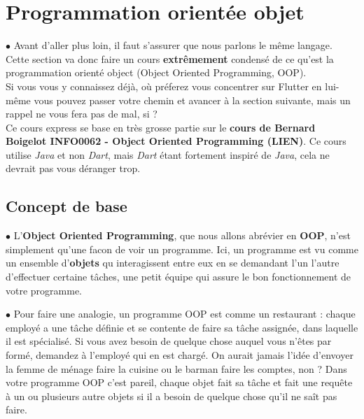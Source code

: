 \section{Programmation orientée objet}
\par $\bullet$ Avant d'aller plus loin, il faut s'assurer que nous parlons le même langage. Cette section va donc faire un cours \textbf{extrêmement} condensé de ce qu'est la programmation orienté object (Object Oriented Programming, OOP). \\

Si vous vous y connaissez déjà, où préferez vous concentrer sur Flutter en lui-même vous pouvez passer votre chemin et avancer à la section suivante, mais un rappel ne vous fera pas de mal, si ? \\

Ce cours express se base en très grosse partie sur le \textbf{cours de Bernard Boigelot INFO0062 - Object Oriented Programming (LIEN)}. Ce cours utilise \textit{Java} et non \textit{Dart}, mais \textit{Dart} étant fortement inspiré de \textit{Java}, cela ne devrait pas vous déranger trop.

\subsection{Concept de base}
\par $\bullet$ L'\textbf{Object Oriented Programming}, que nous allons abrévier en \textbf{OOP}, n'est simplement qu'une facon de voir un programme. Ici, un programme est vu comme un ensemble d'\textbf{objets} qu interagissent entre eux en se demandant l'un l'autre d'effectuer certaine tâches, une petit équipe qui assure le bon fonctionnement de votre programme.

\par $\bullet$ Pour faire une analogie, un programme OOP est comme un restaurant : chaque employé a une tâche définie et se contente de faire sa tâche assignée, dans laquelle il est spécialisé. Si vous avez besoin de quelque chose auquel vous n'êtes par formé, demandez à l'employé qui en est chargé. On aurait jamais l'idée d'envoyer la femme de ménage faire la cuisine ou le barman faire les comptes, non ? Dans votre programme OOP c'est pareil, chaque objet fait sa tâche et fait une requête à un ou plusieurs autre objets si il a besoin de quelque chose qu'il ne saît pas faire.

